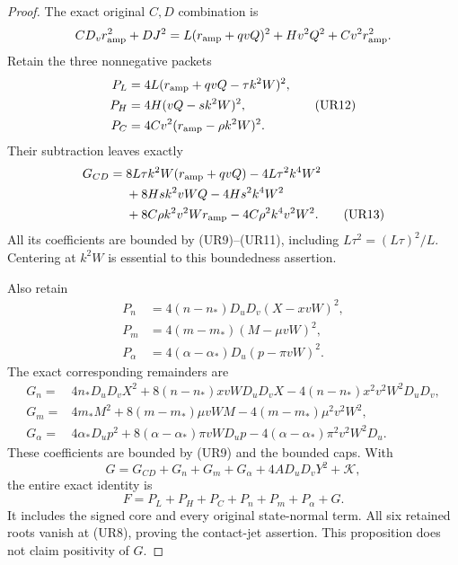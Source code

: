 \begin{proof}
The exact original $C,D$ combination is
\[
 CD_vr_{\rm amp}^2+DJ^2
   =L(r_{\rm amp}+qvQ)^2+Hv^2Q^2+Cv^2r_{\rm amp}^2.
\]
Retain the three nonnegative packets
\[
 \begin{aligned}
 P_L&=4L(r_{\rm amp}+qvQ-\tau k^2W)^2,\\
 P_H&=4H(vQ-sk^2W)^2,\\
 P_C&=4Cv^2(r_{\rm amp}-\rho k^2W)^2.
 \end{aligned}                                                   \tag{UR12}
\]
Their subtraction leaves exactly
\begin{align*}
 G_{CD}={}&8L\tau k^2W(r_{\rm amp}+qvQ)-4L\tau^2k^4W^2\\
 &+8Hs k^2vWQ-4Hs^2k^4W^2\\
 &+8C\rho k^2v^2Wr_{\rm amp}-4C\rho^2k^4v^2W^2.
 \tag{UR13}
\end{align*}
All its coefficients are bounded by (UR9)--(UR11), including
$L\tau^2=(L\tau)^2/L$. Centering at $k^2W$ is essential to this
boundedness assertion.

Also retain
\[
 \begin{aligned}
 P_n&=4(n-n_*)D_uD_v(X-xvW)^2,\\
 P_m&=4(m-m_*)(M-\mu vW)^2,\\
 P_\alpha&=4(\alpha-\alpha_*)D_u(p-\pi vW)^2.
 \end{aligned}                                                   \tag{UR14}
\]
The exact corresponding remainders are
\[
 \begin{aligned}
 G_n={}&4n_*D_uD_vX^2+8(n-n_*)xvWD_uD_vX
                    -4(n-n_*)x^2v^2W^2D_uD_v,\\
 G_m={}&4m_*M^2+8(m-m_*)\mu vWM
                    -4(m-m_*)\mu^2v^2W^2,\\
 G_\alpha={}&4\alpha_*D_up^2+8(\alpha-\alpha_*)\pi vWD_up
                    -4(\alpha-\alpha_*)\pi^2v^2W^2D_u.
 \end{aligned}                                                   \tag{UR15}
\]
These coefficients are bounded by (UR9) and the bounded caps. With
\[
 G=G_{CD}+G_n+G_m+G_\alpha+4AD_uD_vY^2+\mathcal K,
\]
the entire exact identity is
\[
 F=P_L+P_H+P_C+P_n+P_m+P_\alpha+G.                 \tag{UR16}
 \label{pc3daa35e9a9b:eq:ui-entire-reduction}
\]
It includes the signed core and every original state-normal term.
All six retained roots vanish at (UR8), proving the contact-jet
assertion. This proposition does not claim positivity of $G$.
\end{proof}

